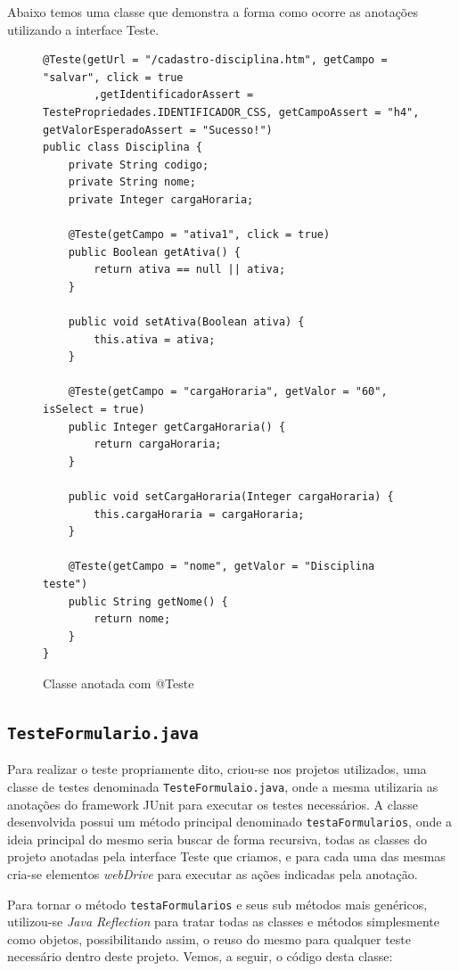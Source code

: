 \documentclass[tg]{mdtufsm}
\begin{document}
Abaixo temos uma classe que demonstra a forma como ocorre as anotações utilizando a interface Teste.

\begin{figure}[!htt]
\begin{lstlisting}
@Teste(getUrl = "/cadastro-disciplina.htm", getCampo = "salvar", click = true
        ,getIdentificadorAssert = TestePropriedades.IDENTIFICADOR_CSS, getCampoAssert = "h4", getValorEsperadoAssert = "Sucesso!")
public class Disciplina {
    private String codigo;
    private String nome;
    private Integer cargaHoraria;
   
    @Teste(getCampo = "ativa1", click = true)
    public Boolean getAtiva() {
        return ativa == null || ativa;
    }

    public void setAtiva(Boolean ativa) {
        this.ativa = ativa;
    }

    @Teste(getCampo = "cargaHoraria", getValor = "60", isSelect = true)
    public Integer getCargaHoraria() {
        return cargaHoraria;
    }

    public void setCargaHoraria(Integer cargaHoraria) {
        this.cargaHoraria = cargaHoraria;
    }

    @Teste(getCampo = "nome", getValor = "Disciplina teste")
    public String getNome() {
        return nome;
    }
}
\end{lstlisting}
	\caption{Classe anotada com @Teste}
	\label{code:Disciplina.java}
\end{figure}

\subsection{\texttt{TesteFormulario.java}}
Para realizar o teste propriamente dito, criou-se nos projetos utilizados, uma classe de testes denominada \texttt{TesteFormulaio.java}, onde a mesma utilizaria as anotações do framework JUnit  para executar os testes necessários. A classe desenvolvida possui um método principal denominado \texttt{testaFormularios}, onde a ideia principal do mesmo seria buscar de forma recursiva, todas as classes do projeto anotadas pela interface Teste que criamos, e para cada uma das mesmas cria-se elementos \emph{webDrive} para executar as ações indicadas pela anotação. 

Para tornar o método \texttt{testaFormularios} e seus sub métodos mais genéricos, utilizou-se \emph{Java Reflection} para tratar todas as classes e métodos simplesmente como objetos, possibilitando assim, o reuso do mesmo para qualquer teste necessário dentro deste projeto. Vemos, a seguir, o código desta classe:
\end{document}
